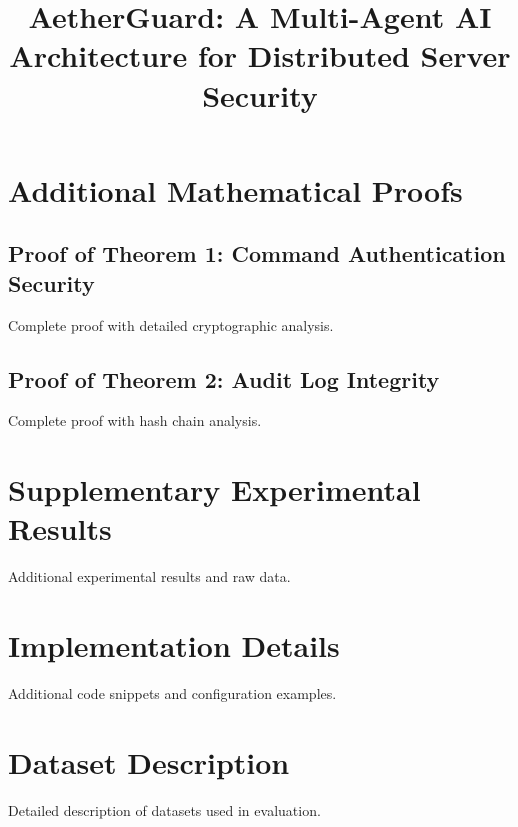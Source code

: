 \documentclass[10pt,journal,compsoc]{IEEEtran}
\newcommand{\systemname}{AetherGuard}
\begin{document}
\title{\systemname: A Multi-Agent AI Architecture for Distributed Server Security}

\author{
}

\maketitle













\appendix

\section{Additional Mathematical Proofs}
\label{app:proofs}

\subsection{Proof of Theorem 1: Command Authentication Security}

Complete proof with detailed cryptographic analysis.

\subsection{Proof of Theorem 2: Audit Log Integrity}

Complete proof with hash chain analysis.

\section{Supplementary Experimental Results}
\label{app:experiments}

Additional experimental results and raw data.

\section{Implementation Details}
\label{app:implementation}

Additional code snippets and configuration examples.

\section{Dataset Description}
\label{app:dataset}

Detailed description of datasets used in evaluation.
\end{document}

